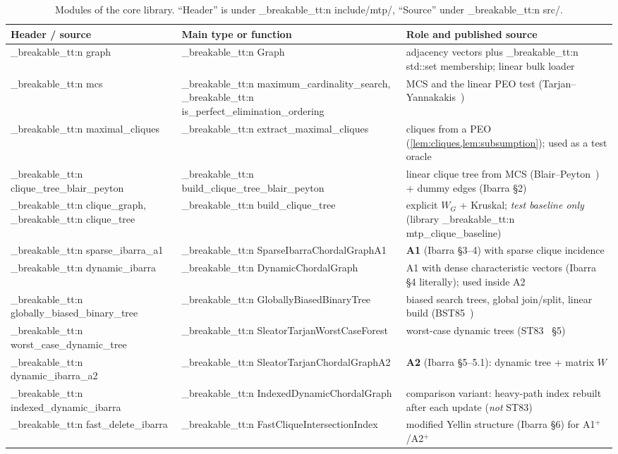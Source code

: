 \documentclass[11pt,a4paper,oneside]{report}
\theoremstyle{plain}
\theoremstyle{definition}
\theoremstyle{remark}
\DeclareRobustCommand{\code}[1]{\mtp_breakable_tt:n {#1}}
\DeclareRobustCommand{\file}[1]{\mtp_breakable_tt:n {#1}}
\begin{document}
\begin{table}[ht]
\centering\small
\caption[Modules of the core library]{Modules of the core library. ``Header'' is under \file{include/mtp/}, ``Source''
under \file{src/}.}\label{tab:modules}
\begin{tabularx}{\textwidth}{@{}>{\raggedright\arraybackslash}p{3.4cm}>{\raggedright\arraybackslash}p{4.6cm}X@{}}
\toprule
\textbf{Header / source} & \textbf{Main type or function} & \textbf{Role and published source}\\
\midrule
\file{graph} & \code{Graph} & adjacency vectors plus \code{std::set} membership; linear bulk loader\\
\file{mcs} & \code{maximum_cardinality_search}, \code{is_perfect_elimination_ordering} & MCS and the linear PEO test (Tarjan--Yannakakis~\cite{tarjan1984})\\
\file{maximal_cliques} & \code{extract_maximal_cliques} & cliques from a PEO (\cref{lem:cliques,lem:subsumption}); used as a test oracle\\
\file{clique_tree_blair_peyton} & \code{build_clique_tree_blair_peyton} & linear clique tree from MCS (Blair--Peyton~\cite{blair1993}) + dummy edges (Ibarra \S2)\\
\file{clique_graph}, \file{clique_tree} & \code{build_clique_tree} & explicit \(W_G\) + Kruskal; \emph{test baseline only} (library \code{mtp_clique_baseline})\\
\file{sparse_ibarra_a1} & \code{SparseIbarraChordalGraphA1} & \textbf{A1} (Ibarra \S3--4) with sparse clique incidence\\
\file{dynamic_ibarra} & \code{DynamicChordalGraph} & A1 with dense characteristic vectors (Ibarra \S4 literally); used inside A2\\
\file{globally_biased_binary_tree} & \code{GloballyBiasedBinaryTree} & biased search trees, global join/split, linear build (BST85~\cite{bent1985})\\
\file{worst_case_dynamic_tree} & \code{SleatorTarjanWorstCaseForest} & worst-case dynamic trees (ST83~\cite{sleator1983} \S5)\\
\file{dynamic_ibarra_a2} & \code{SleatorTarjanChordalGraphA2} & \textbf{A2} (Ibarra \S5--5.1): dynamic tree + matrix \(W\)\\
\file{indexed_dynamic_ibarra} & \code{IndexedDynamicChordalGraph} & comparison variant: heavy-path index rebuilt after each update (\emph{not} ST83)\\
\file{fast_delete_ibarra} & \code{FastCliqueIntersectionIndex} & modified Yellin structure (Ibarra \S6) for A1\(^+\)/A2\(^+\)\\
\bottomrule
\end{tabularx}
\end{table}
\end{document}
